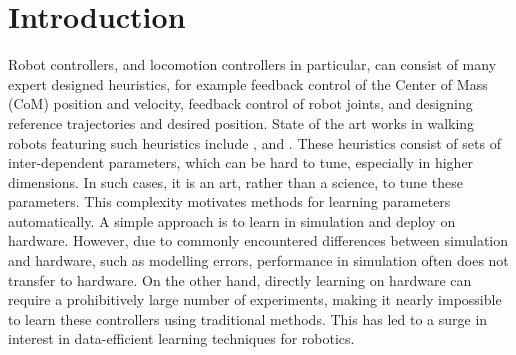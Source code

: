 \chapter{Introduction}
\label{chap:intro}
Robot controllers, and locomotion controllers in particular, can consist of many expert designed heuristics, for example feedback control of the Center of Mass (CoM) position and velocity, feedback control of robot joints, and designing reference trajectories and desired position. State of the art works in walking robots featuring such heuristics include \cite{feng2015optimization}, \cite{kuindersma2016optimization} and \cite{hubicki2016walking}. These heuristics consist of sets of inter-dependent parameters, which can be hard to tune, especially in higher dimensions. In such cases, it is an art, rather than a science, to tune these parameters. 
This complexity motivates methods for learning parameters automatically. A simple approach is to learn in simulation and deploy on hardware. However, due to commonly encountered differences between simulation and hardware, such as modelling errors, performance in simulation often does not transfer to hardware. On the other hand, directly learning on hardware can require a prohibitively large number of experiments, making it nearly impossible to learn these controllers using traditional methods. This has led to a surge in interest in data-efficient learning techniques for robotics. 

